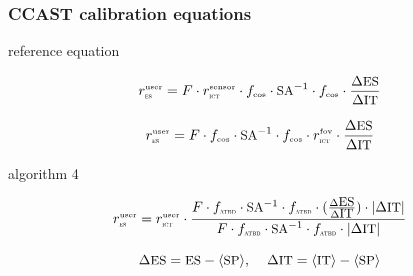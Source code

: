 \documentclass[9pt]{beamer}
\begin{document}
\begin{frame}
\frametitle{CCAST calibration equations}


\begin{center}
{\ccast} reference equation
\end{center}
\vspace{-2mm}
\begin{equation}
  \rESuser = F \cdot \rITsensor \cdot \fcos \cdot \SA^{-1}\cdot \fcos 
         \cdot \frac{\Delta\ES}{\Delta\IT}
\end{equation}

\begin{equation}
  \rESuser = F \cdot \fcos \cdot \SA^{-1}\cdot \fcos \cdot \rITfov 
         \cdot \frac{\Delta\ES}{\Delta\IT}
\end{equation}

\vspace{3mm}
\begin{center}
{\noaa} algorithm 4
\end{center}
\vspace{-2mm}
\begin{equation}
  \rESuser = \rITuser \cdot
         \frac{F \cdot \fatbd \cdot \SA^{-1}\cdot \fatbd \cdot 
                  (\frac{\Delta\ES}{\Delta\IT}) \cdot {|\Delta\IT|}}
              {F \cdot \fatbd \cdot \SA^{-1}\cdot \fatbd \cdot {|\Delta\IT|}}
\end{equation}

\vspace{3mm}
\[ \Delta\ES = \ES - \SPmean, \hspace{4mm}
   \Delta\IT = \ITmean - \SPmean \]

\end{frame}
\end{document}
